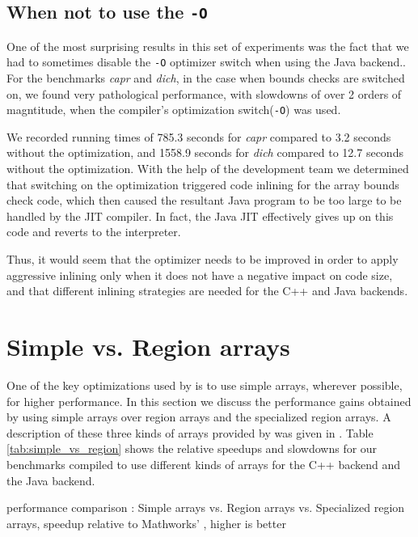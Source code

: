 \subsection{When not to use the \xten \texttt{-O}}
\label{sec:BOOM}

One of the most surprising results in this set of experiments was the fact that
we had to sometimes disable the \xten \texttt{-O} optimizer switch when
using the \xten Java backend..
For the benchmarks \emph{capr} and
\emph{dich}, in the case when \xten bounds checks are switched on, we found
very pathological performance, with slowdowns of over 2 orders of magntitude,
when the \xten compiler's optimization switch(\texttt{-O}) was used.

We recorded running times of 785.3 seconds for \emph{capr} compared to 3.2
seconds without the optimization, and 1558.9 seconds for \emph{dich} compared to
12.7 seconds without the optimization.  With the help of the \xten development
team we determined that switching on the optimization triggered code inlining
for the array bounds check code, which then
caused the resultant Java program to be too large to be handled by the JIT
compiler.  In fact, the Java JIT effectively gives up on this code and reverts 
to the interpreter. 

Thus, it would seem that the \xten optimizer needs to be improved in order to
apply aggressive inlining only when it does not have a negative impact on code
size,  and that different inlining strategies are needed for the C++ and Java
backends.

\section{Simple vs. Region arrays} \label{sec:EvalArrays}

One of the key optimizations used by \mixten is to use simple arrays,
wherever possible, for higher performance.  In this section we discuss the
performance gains obtained by using simple arrays over region arrays and
the specialized region arrays.  A description of these three kinds of arrays
provided by \xten was given in .  Table
\ref{tab:simple_vs_region} shows the relative speedups and slowdowns for our
benchmarks compiled to use different kinds of \xten arrays for the C++ backend
and the Java backend.

\begin{table}[htbp]
\begin{center} 
\scalebox{0.67}{

}
\caption{\mixten performance comparison : Simple
arrays vs. Region arrays vs.  Specialized region arrays, speedup relative to 
Mathworks' \matlab, higher is better} 
\label{tab:simple_vs_region} 
\end{center}
\end{table}

